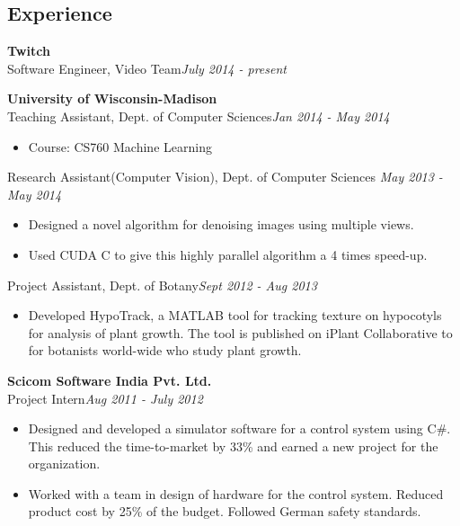 \documentclass[margin]{res}
\begin{document}
\begin{resume}
\section{Experience}
 {\bf Twitch} \\
 Software Engineer, Video Team\hfill {\it July 2014 - present}
 
 {\bf University of Wisconsin-Madison} \\
Teaching Assistant,  Dept. of Computer Sciences\hfill {\it Jan 2014 - May 2014}
\begin{itemize} \itemsep -2pt  %
 \item Course: CS760 Machine Learning
\end{itemize}

Research Assistant(Computer Vision), Dept. of Computer Sciences \hfill {\it May 2013 - May 2014}
 \begin{itemize} \itemsep -2pt  %
 \item Designed a novel algorithm for denoising images using multiple views.
 \item Used CUDA C to give this highly parallel algorithm a 4 times speed-up. 
 \end{itemize}


Project Assistant,  Dept. of Botany\hfill {\it Sept 2012 - Aug 2013}
 \begin{itemize} \itemsep -2pt  %
 \item Developed HypoTrack, a MATLAB tool for tracking texture on hypocotyls for analysis of plant growth. The tool is published on iPlant Collaborative to for botanists world-wide who study plant growth.
 \end{itemize}
  {\bf Scicom Software India Pvt. Ltd.} \\
Project Intern\hfill{\it Aug 2011 - July 2012}
 \begin{itemize} \itemsep -2pt  %
 \item Designed and developed a simulator software for a control system using C\#. This reduced the time-to-market by 33\% and earned a new project for the organization.
 \item Worked with a team in design of hardware for the control system. Reduced product cost by 25\% of the budget. Followed German safety standards. 

 \end{itemize}

\end{resume}
\end{document}
